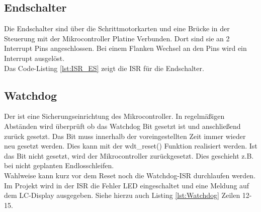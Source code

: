\subsection{Endschalter}
\label{sec:Endschalter_SW}
Die Endschalter sind über die Schrittmotorkarten und eine Brücke in der Steuerung mit der Mikrocontroller Platine Verbunden. Dort sind sie an 2 Interrupt Pins angeschlossen.  Bei einem Flanken Wechsel an den Pins wird ein Interrupt ausgelöst. \\
Das Code-Listing \ref{lst:ISR_ES} zeigt die ISR für die Endschalter.
\lstset{language=C, basicstyle=\footnotesize, showstringspaces=false, tabsize=2}

\subsection{Watchdog}
Der  ist eine Sicherungseinrichtung des Mikrocontroller. In regelmäßigen Abständen wird überprüft ob das Watchdog Bit gesetzt ist und anschließend zurück gesetzt. Das Bit muss innerhalb der voreingestellten Zeit immer wieder neu gesetzt werden. Dies kann mit der wdt\_reset() Funktion realisiert werden. Ist das Bit nicht gesetzt, wird der Mikrocontroller zurückgesetzt.  Dies geschieht z.B. bei nicht geplanten Endlosschleifen.\\
Wahlweise kann kurz vor dem Reset noch die Watchdog-ISR durchlaufen werden.\\
Im Projekt wird in der ISR die Fehler LED eingeschaltet und eine Meldung auf dem LC-Display ausgegeben. Siehe hierzu auch Listing \ref{lst:Watchdog} Zeilen 12-15.
\lstset{language=C, basicstyle=\footnotesize, showstringspaces=false, tabsize=4}


